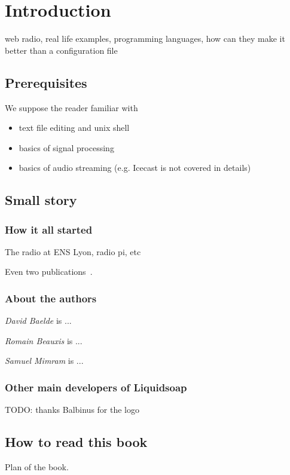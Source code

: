 \chapter{Introduction}
web radio, real life examples, programming languages, how can they make it
better than a configuration file

\section{Prerequisites}
We suppose the reader familiar with
\begin{itemize}
\item text file editing and unix shell
\item basics of signal processing
\item basics of audio streaming (e.g. Icecast is not covered in details)
\end{itemize}

\section{Small story}
\subsection{How it all started}
The radio at ENS Lyon, radio pi, etc

Even two publications~\cite{baelde2008webradio, baelde2011liquidsoap}.

\subsection{About the authors}
\emph{David Baelde} is ...

\emph{Romain Beauxis} is ...

\emph{Samuel Mimram} is ...

\subsection{Other main developers of Liquidsoap}

TODO: thanks Balbinus for the logo

\section{How to read this book}
Plan of the book.